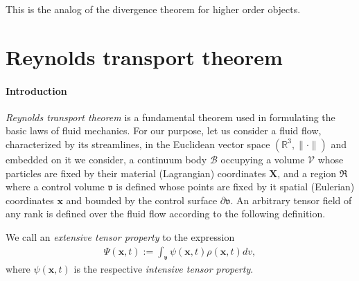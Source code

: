This is the analog of the divergence theorem for higher order
objects.

\section{Reynolds transport theorem}
\label{reynolds-transport}


\paragraph{Introduction}
{\em Reynolds transport theorem} \citep{Reynolds:1903} is a fundamental
theorem used in formulating the basic laws of fluid mechanics. For our
purpose, let us consider a fluid flow, characterized by its
streamlines, in the Euclidean vector space
$(\mathbb{R}^3,\lVert\cdot\rVert)$ and embedded on it we consider, a
continuum body $\mathscr{B}$ occupying a volume $\mathscr{V}$ whose
particles are fixed by their material (Lagrangian) coordinates
$\mathbf{X}$, and a region $\Re$ where a control volume $\mathfrak{v}$
is defined whose points are fixed by it spatial (Eulerian) coordinates
$\mathbf{x}$ and bounded by the control surface
$\partial\mathfrak{v}$. An arbitrary tensor field of any rank is
defined over the fluid flow according to the following definition.
\begin{definition*} We call an {\em extensive tensor property} to the expression
\begin{align}
\Psi(\mathbf{x},t):=
\int_{\mathfrak{v}}\psi(\mathbf{x},t)\rho(\mathbf{x},t)dv,
\end{align}
where $\psi(\mathbf{x},t)$ is the respective {\em intensive tensor property}.
\end{definition*}

